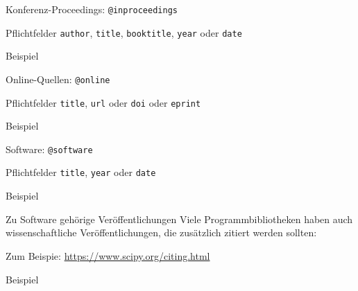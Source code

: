 \begin{frame}[fragile]{Konferenz-Proceedings: \lstinline+@inproceedings+}
  \begin{block}{Pflichtfelder}
    \texttt{author}, \hspace{2em}
    \texttt{title}, \hspace{2em}
    \texttt{booktitle}, \hspace{2em}
    \texttt{year} oder \texttt{date}
  \end{block}

  \begin{block}{Beispiel}
    
  \end{block}
\end{frame}

\begin{frame}[fragile]{Online-Quellen: \lstinline+@online+}
  \begin{block}{Pflichtfelder}
    \texttt{title}, \hspace{2em}
    \texttt{url} oder \texttt{doi} oder \texttt{eprint}
  \end{block}

  \begin{block}{Beispiel}
    
  \end{block}
\end{frame}

\begin{frame}[fragile]{Software: \lstinline+@software+}
  \begin{block}{Pflichtfelder}
    \texttt{title}, \hspace{2em}
    \texttt{year} oder \texttt{date}
  \end{block}

  \begin{block}{Beispiel}
    
  \end{block}
\end{frame}

\begin{frame}[fragile]{Zu Software gehörige Veröffentlichungen}
  Viele Programmbibliotheken haben auch wissenschaftliche Veröffentlichungen,
  die zusätzlich zitiert werden sollten:

  Zum Beispie: \url{https://www.scipy.org/citing.html}

  \begin{block}{Beispiel}
    \footnotesize
    
  \end{block}

\end{frame}

